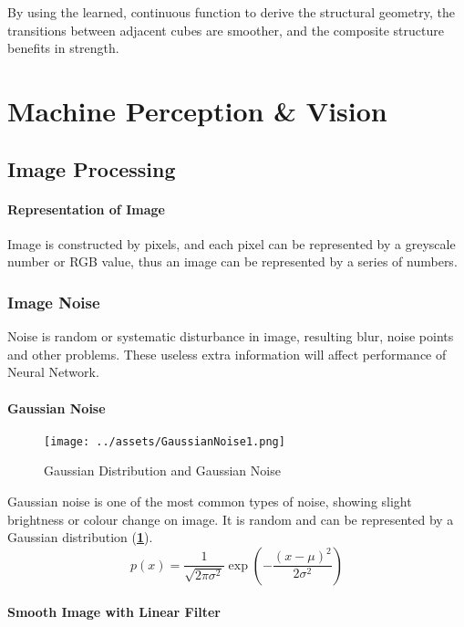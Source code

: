\documentclass[a4paper, openany]{book}
\begin{document}
By using the learned, continuous function to derive the structural geometry, the transitions between adjacent cubes are smoother, and the composite structure benefits in strength.

\section{Machine Perception \& Vision}

\subsection{Image Processing}

\paragraph{Representation of Image}\label{sec:ImageRepresentation}

Image is constructed by pixels, and each pixel can be represented by a greyscale number or RGB value, thus an image can be represented by a series of numbers.

\subsubsection{Image Noise}

Noise is random or systematic disturbance in image, resulting blur, noise points and other problems. These useless extra information will affect performance of Neural Network.

\paragraph{Gaussian Noise}

\begin{figure}[htbp]
  \centering
  \texttt{[image: ../assets/GaussianNoise1.png]}
  \caption{Gaussian Distribution and Gaussian Noise}
  \label{fig:GaussianNoise1}
\end{figure}

Gaussian noise is one of the most common types of noise, showing slight brightness or colour change on image. It is random and can be represented by a Gaussian distribution (\textbf{\cref{fig:GaussianNoise1}}).
$$p(x) = \frac{1}{\sqrt{2 \pi \sigma^2}} \exp (-\frac{(x - \mu)^2}{2 \sigma^2})$$

\paragraph{Smooth Image with Linear Filter}
\end{document}
